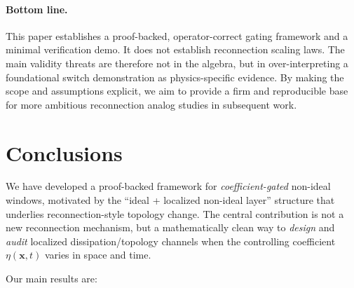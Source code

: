 \documentclass[11pt]{article}
\theoremstyle{plain}
\theoremstyle{definition}
\theoremstyle{remark}
\begin{document}
\paragraph{Bottom line.}
This paper establishes a proof-backed, operator-correct gating framework and a minimal verification demo.
It does not establish reconnection scaling laws. The main validity threats are therefore not in the
algebra, but in over-interpreting a foundational switch demonstration as physics-specific evidence.
By making the scope and assumptions explicit, we aim to provide a firm and reproducible base for more
ambitious reconnection analog studies in subsequent work.

\section{Conclusions}\label{sec:conclusions}

We have developed a proof-backed framework for \emph{coefficient-gated} non-ideal windows, motivated by
the ``ideal + localized non-ideal layer'' structure that underlies reconnection-style topology change.
The central contribution is not a new reconnection mechanism, but a mathematically clean way to
\emph{design} and \emph{audit} localized dissipation/topology channels when the controlling coefficient
$\eta(\mathbf{x},t)$ varies in space and time.

Our main results are:
\end{document}
